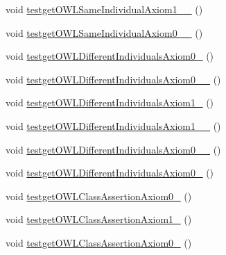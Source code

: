 \begin{DoxyCompactItemize}
\item 
void \hyperlink{classorg_1_1semanticweb_1_1owlapi_1_1api_1_1test_1_1_null_check_test_case_a442dacc14af1a466c73ba14635549d87}{testget\-O\-W\-L\-Same\-Individual\-Axiom1\-\_\-\_} ()
\item 
void \hyperlink{classorg_1_1semanticweb_1_1owlapi_1_1api_1_1test_1_1_null_check_test_case_a442e273a94b8ef48d8d386df0474c029}{testget\-O\-W\-L\-Same\-Individual\-Axiom0\-\_\-\_} ()
\item 
void \hyperlink{classorg_1_1semanticweb_1_1owlapi_1_1api_1_1test_1_1_null_check_test_case_a6c3ab15d16609a3a6e51f769d7c88d05}{testget\-O\-W\-L\-Different\-Individuals\-Axiom0\-\_} ()
\item 
void \hyperlink{classorg_1_1semanticweb_1_1owlapi_1_1api_1_1test_1_1_null_check_test_case_ad4a0e3a8110a75a0236dc085f8073e32}{testget\-O\-W\-L\-Different\-Individuals\-Axiom0\-\_\-\_} ()
\item 
void \hyperlink{classorg_1_1semanticweb_1_1owlapi_1_1api_1_1test_1_1_null_check_test_case_a435a346006d40f0cdacef96183165a86}{testget\-O\-W\-L\-Different\-Individuals\-Axiom1\-\_} ()
\item 
void \hyperlink{classorg_1_1semanticweb_1_1owlapi_1_1api_1_1test_1_1_null_check_test_case_a59c7ae6b0a2952ad6fc7e0ac64d9136b}{testget\-O\-W\-L\-Different\-Individuals\-Axiom1\-\_\-\_} ()
\item 
void \hyperlink{classorg_1_1semanticweb_1_1owlapi_1_1api_1_1test_1_1_null_check_test_case_acf0960f8f5ab2abc805c3cf9e998e01c}{testget\-O\-W\-L\-Different\-Individuals\-Axiom0\-\_\-\_} ()
\item 
void \hyperlink{classorg_1_1semanticweb_1_1owlapi_1_1api_1_1test_1_1_null_check_test_case_a1b7fa7487b3765c9c729e0640e16917c}{testget\-O\-W\-L\-Different\-Individuals\-Axiom0\-\_} ()
\item 
void \hyperlink{classorg_1_1semanticweb_1_1owlapi_1_1api_1_1test_1_1_null_check_test_case_a6faf19b3632cfb2fae6f90112b0b30d1}{testget\-O\-W\-L\-Class\-Assertion\-Axiom0\-\_} ()
\item 
void \hyperlink{classorg_1_1semanticweb_1_1owlapi_1_1api_1_1test_1_1_null_check_test_case_af066c9ed799f71f686ca0a8419b9344f}{testget\-O\-W\-L\-Class\-Assertion\-Axiom1\-\_} ()
\item 
void \hyperlink{classorg_1_1semanticweb_1_1owlapi_1_1api_1_1test_1_1_null_check_test_case_af7f730eaa8fb7cde8efc0766a8a367ae}{testget\-O\-W\-L\-Class\-Assertion\-Axiom0\-\_} ()
\item 

\end{DoxyCompactItemize}
